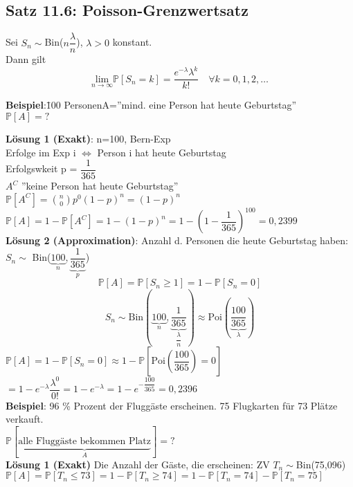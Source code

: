 \subsection{Satz 11.6: Poisson-Grenzwertsatz}
Sei $S_n \sim$Bin($n\dfrac{\lambda}{n}$), $\lambda >0$ konstant.\smallskip\\
Dann gilt
$$\underset{n\rightarrow\infty}{\text{lim}}\mathds{P}[S_n=k] = \dfrac{e^{-\lambda}\lambda^k}{k!}\quad \forall k = 0,1,2,\dots$$
\begin{tabbing}
	\textbf{Beispiel}:\= 100 Personen\hspace{1cm}A=''mind. eine Person hat heute Geburtstag''\\$\mathds{P}[A] = ?$
\end{tabbing}
\textbf{Lösung 1 (Exakt)}: n=100, Bern-Exp\\
Erfolge im Exp i $ \Leftrightarrow $ Person i hat heute Geburtstag\\Erfolgswkeit p = $\dfrac{1}{365}$\smallskip\\
$A^C$ ''keine Person hat heute Geburtstag''\\
$\mathds{P}[A^C] = \binom{n}{0}p^0(1-p)^n=(1-p)^n $\smallskip\\
$\mathds{P}[A]=1-\mathds{P}[A^C]=1-(1-p)^n=1-\left(1-\dfrac{1}{365}\right)^{100} = 0,2399$\medskip\\
\textbf{Lösung 2 (Approximation)}: Anzahl d. Personen die heute Geburtstag haben: $S_n \sim $ Bin($\underbrace{100}_n,\underbrace{\dfrac{1}{365}}_p$)
$$\mathds{P}[A]=\mathds{P}[S_n \geq 1] = 1-\mathds{P}[S_n=0]$$
$$S_n \sim \text{Bin}(\underbrace{100}_n,\underbrace{\dfrac{1}{365}}_{\dfrac{\lambda}{n}})\approx \text{Poi}(\underbrace{\dfrac{100}{365}}_\lambda)$$
$\mathds{P}[A] = 1-\mathds{P}[S_n=0] \approx 1 - \mathds{P}[\text{Poi}\left(\dfrac{100}{365}\right)=0]$\smallskip\\
$=1-e^{-\lambda}\dfrac{\lambda^0}{0!}=1-e^{-\lambda}=1-e^{-\dfrac{100}{365}} = 0,2396$\medskip\\
\textbf{Beispiel}: 96 \% Prozent der Fluggäste erscheinen. 75 Flugkarten für 73 Plätze verkauft.\medskip\\
$\mathds{P}[\underbrace{\text{alle Fluggäste bekommen Platz}}_A] = ?$\medskip\\
\textbf{Lösung 1 (Exakt)} Die Anzahl der Gäste, die erscheinen: ZV $T_n \sim $Bin(75,096)\smallskip\\
$\mathds{P}[A] = \mathds{P}[T_n\leq 73] = 1-\mathds{P}[T_n \geq 74]=1-\mathds{P}[T_n = 74]-\mathds{P}[T_n=75]$\smallskip\\
